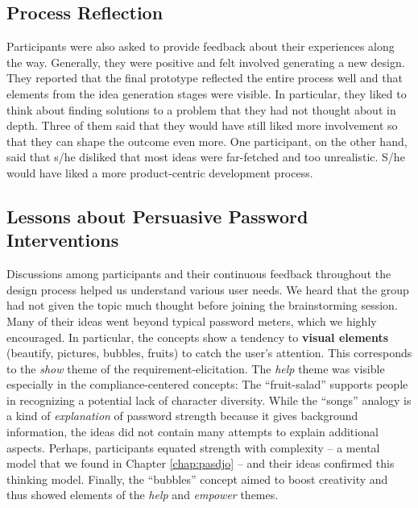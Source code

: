 \subsection{Process Reflection}
Participants were also asked to provide feedback about their experiences along the way. Generally, they were positive and felt involved generating a new design. They reported that the final prototype reflected the entire process well and that elements from the idea generation stages were visible. In particular, they liked to think about finding solutions to a problem that they had not thought about in depth. Three of them said that they would have still liked more involvement so that they can shape the outcome even more. One participant, on the other hand, said that s/he disliked that most ideas were far-fetched and too unrealistic. S/he would have liked a more product-centric development process.

\subsection{Lessons about Persuasive Password Interventions}
Discussions among participants and their continuous feedback throughout the design process helped us understand various user needs. We heard that the group had not given the topic much thought before joining the brainstorming session. Many of their ideas went beyond typical password meters, which we highly encouraged. In particular, the concepts show a tendency to \textbf{visual elements} (beautify, pictures, bubbles, fruits) to catch the user's attention. This corresponds to the \textit{show} theme of the requirement-elicitation. The \textit{help} theme was visible especially in the compliance-centered concepts: The ``fruit-salad'' supports people in recognizing a potential lack of character diversity. While the ``songs'' analogy is a kind of \textit{explanation} of password strength because it gives background information, the ideas did not contain many attempts to explain additional aspects. Perhaps, participants equated strength with complexity -- a mental model that we found in Chapter \ref{chap:pasdjo} -- and their ideas confirmed this thinking model. Finally, the ``bubbles'' concept aimed to boost creativity and thus showed elements of the \textit{help} and \textit{empower} themes. 

